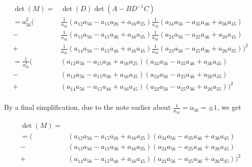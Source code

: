 \documentclass{article}
\renewcommand{\a}[1]{a_{#1}}
\begin{document}
\begin{equation}
  \begin{split}
    \det(M) = &\det(D)\det(A - BD^{-1}C) \\
   = \a{56}^2(
            &\frac{1}{\a{56}}(\a{12}\a{56} - \a{15}\a{26} + \a{16}\a{25}) \frac{1}{\a{56}}(\a{34}\a{56} - \a{35}\a{46} + \a{36}\a{45}) \\%
          - &\frac{1}{\a{56}}(\a{13}\a{56} - \a{15}\a{36} + \a{16}\a{35}) \frac{1}{\a{56}}(\a{24}\a{56} - \a{25}\a{46} + \a{26}\a{45}) \\%
          + &\frac{1}{\a{56}}(\a{14}\a{56} - \a{15}\a{46} + \a{16}\a{45}) \frac{1}{\a{56}}(\a{23}\a{56} - \a{25}\a{36} + \a{26}\a{35}) %
          )^2\\
   = \frac{1}{\a{56}^2}(
            &(\a{12}\a{56} - \a{15}\a{26} + \a{16}\a{25}) (\a{34}\a{56} - \a{35}\a{46} + \a{36}\a{45}) \\
          - &(\a{13}\a{56} - \a{15}\a{36} + \a{16}\a{35}) (\a{24}\a{56} - \a{25}\a{46} + \a{26}\a{45}) \\
          + &(\a{14}\a{56} - \a{15}\a{46} + \a{16}\a{45}) (\a{23}\a{56} - \a{25}\a{36} + \a{26}\a{35})
          )^2\\
  \end{split}
  \end{equation}

By a final simplification, due to the note earlier about $\frac{1}{a_{56}} =
a_{56} = \pm 1$, we get

\begin{equation}
  \begin{split}
    \det(M) =  \\
   = (
            &(\a{12}\a{56} - \a{15}\a{26} + \a{16}\a{25}) (\a{34}\a{56} - \a{35}\a{46} + \a{36}\a{45}) \\
          - &(\a{13}\a{56} - \a{15}\a{36} + \a{16}\a{35}) (\a{24}\a{56} - \a{25}\a{46} + \a{26}\a{45}) \\
          + &(\a{14}\a{56} - \a{15}\a{46} + \a{16}\a{45}) (\a{23}\a{56} - \a{25}\a{36} + \a{26}\a{35})
          )^2
  \end{split}
  \end{equation}
\end{document}
